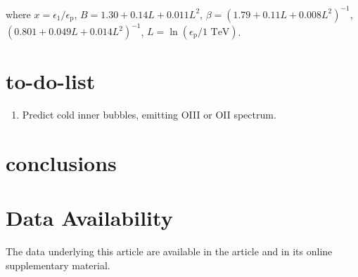 \documentclass[twocolumn]{aastex631}
\begin{document}
where
$x=\epsilon_{1}/\epsilon_{\text{p}}$, $B=1.30+0.14L+0.011L^2$, $\beta=\left(1.79+0.11L+0.008L^{2}\right)^{-1}$,\
$\left(0.801+0.049L+0.014L^{2}\right)^{-1}$, $L=\ln(\epsilon_{\text{p}}/1 \text{ TeV})$.


\section{to-do-list}
\begin{enumerate}
  \item Predict cold inner bubbles, emitting OIII or OII spectrum.
\end{enumerate}

\section{conclusions}

\section*{Data Availability}
The data underlying this article are available in the article and in its online supplementary material.





\appendix
\end{document}
